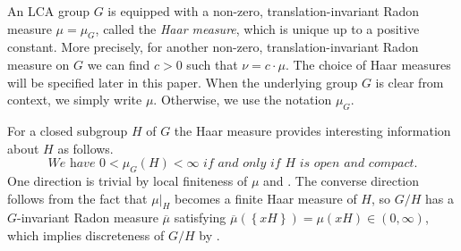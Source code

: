 \documentclass[12pt,reqno]{amsart}
\theoremstyle{definition}
\theoremstyle{definition}
\theoremstyle{definition}
\numberwithin{thm}{section}
\numberwithin{equation}{section}
\begin{document}
An LCA group $G$ is equipped with a non-zero, translation-invariant Radon measure $\mu = \mu_G$, called the {\em Haar measure}, which is unique up to a positive constant. More precisely, for another non-zero, translation-invariant Radon measure on $G$ we can find $c>0$ such that $\nu = c\cdot \mu$. The choice of Haar measures will be specified later in this paper. When the underlying group $G$ is clear from context, we simply write $\mu$. Otherwise, we use the notation $\mu_G$.

For a closed subgroup $H$ of $G$ the Haar measure provides interesting information about $H$ as follows.
    \begin{equation}\label{eq-cpt-open-Haar}
        \textit{We have $0<\mu_G(H)<\infty$ if and only if $H$ is open and compact.}
    \end{equation}
One direction is trivial by local finiteness of $\mu$ and \cite[Proposition 2.19]{Folland-book}. The converse direction follows from the fact that $\mu|_H$ becomes a finite Haar measure of $H$, so $G/H$ has a $G$-invariant Radon measure $\overline{\mu}$ satisfying $\overline{\mu}(\left \{xH\right\})=\mu(xH)\in (0,\infty)$, which implies discreteness of $G/H$ by \cite[Proposition 1.4.4]{DeEc09}.
\end{document}
